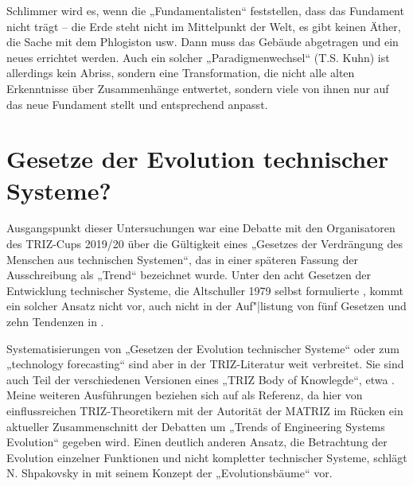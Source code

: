 \documentclass[11pt,a4paper]{article}
\begin{document}
Schlimmer wird es, wenn die „Fundamentalisten“ feststellen, dass das Fundament
nicht trägt -- die Erde steht nicht im Mittelpunkt der Welt, es gibt keinen
Äther, die Sache mit dem Phlogiston usw.  Dann muss das Gebäude abgetragen und
ein neues errichtet werden.  Auch ein solcher „Paradigmenwechsel“ (T.S. Kuhn)
ist allerdings kein Abriss, sondern eine Transformation, die nicht alle alten
Erkenntnisse über Zusammenhänge entwertet, sondern viele von ihnen nur auf das
neue Fundament stellt und entsprechend anpasst.

\section{Gesetze der Evolution technischer Systeme?}

Ausgangspunkt dieser Untersuchungen war eine Debatte mit den Organisatoren des
TRIZ-Cups 2019/20 über die Gültigkeit eines „Gesetzes der Verdrängung des
Menschen aus technischen Systemen“, das in einer späteren Fassung der
Ausschreibung als „Trend“ bezeichnet wurde. Unter den acht Gesetzen der
Entwicklung technischer Systeme, die Altschuller 1979 selbst formulierte
\cite[S. 2]{TESE2018}, kommt ein solcher Ansatz nicht vor, auch nicht in der
Auf"|listung von fünf Gesetzen und zehn Tendenzen in
\cite[S. 148\,ff.]{KS2017}.  

Systematisierungen von „Gesetzen der Evolution technischer Systeme“ oder zum
„technology forecasting“ sind aber in der TRIZ-Literatur weit verbreitet. Sie
sind auch Teil der verschiedenen Versionen eines „TRIZ Body of Knowlegde“,
etwa \cite{TBK-2007}. Meine weiteren Ausführungen beziehen sich auf
\cite{TESE2018} als Referenz, da hier von einflussreichen TRIZ-Theoretikern
mit der Autorität der MATRIZ im Rücken ein aktueller Zusammenschnitt der
Debatten um „Trends of Engineering Systems Evolution“ gegeben wird. Einen
deutlich anderen Ansatz, die Betrachtung der Evolution einzelner Funktionen
und nicht kompletter technischer Systeme, schlägt N. Shpakovsky in
\cite{Shpakovsky2010} mit seinem Konzept der „Evolutionsbäume“ vor.
\end{document}
